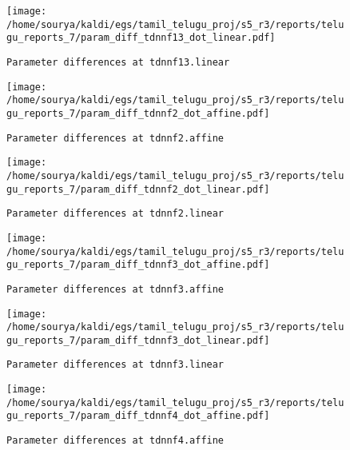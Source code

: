 \documentclass[prl,10pt,twocolumn]{revtex4}
\begin{document}
\newpage
\begin{figure}[h]
  \begin{center}
    \caption{\texttt{Parameter differences at tdnnf13.linear}}
    \texttt{[image: /home/sourya/kaldi/egs/tamil\_telugu\_proj/s5\_r3/reports/telugu\_reports\_7/param\_diff\_tdnnf13\_dot\_linear.pdf]}
  \end{center}
\end{figure}
\clearpage


\newpage
\begin{figure}[h]
  \begin{center}
    \caption{\texttt{Parameter differences at tdnnf2.affine}}
    \texttt{[image: /home/sourya/kaldi/egs/tamil\_telugu\_proj/s5\_r3/reports/telugu\_reports\_7/param\_diff\_tdnnf2\_dot\_affine.pdf]}
  \end{center}
\end{figure}
\clearpage


\newpage
\begin{figure}[h]
  \begin{center}
    \caption{\texttt{Parameter differences at tdnnf2.linear}}
    \texttt{[image: /home/sourya/kaldi/egs/tamil\_telugu\_proj/s5\_r3/reports/telugu\_reports\_7/param\_diff\_tdnnf2\_dot\_linear.pdf]}
  \end{center}
\end{figure}
\clearpage


\newpage
\begin{figure}[h]
  \begin{center}
    \caption{\texttt{Parameter differences at tdnnf3.affine}}
    \texttt{[image: /home/sourya/kaldi/egs/tamil\_telugu\_proj/s5\_r3/reports/telugu\_reports\_7/param\_diff\_tdnnf3\_dot\_affine.pdf]}
  \end{center}
\end{figure}
\clearpage


\newpage
\begin{figure}[h]
  \begin{center}
    \caption{\texttt{Parameter differences at tdnnf3.linear}}
    \texttt{[image: /home/sourya/kaldi/egs/tamil\_telugu\_proj/s5\_r3/reports/telugu\_reports\_7/param\_diff\_tdnnf3\_dot\_linear.pdf]}
  \end{center}
\end{figure}
\clearpage


\newpage
\begin{figure}[h]
  \begin{center}
    \caption{\texttt{Parameter differences at tdnnf4.affine}}
    \texttt{[image: /home/sourya/kaldi/egs/tamil\_telugu\_proj/s5\_r3/reports/telugu\_reports\_7/param\_diff\_tdnnf4\_dot\_affine.pdf]}
  \end{center}
\end{figure}
\clearpage
\end{document}
